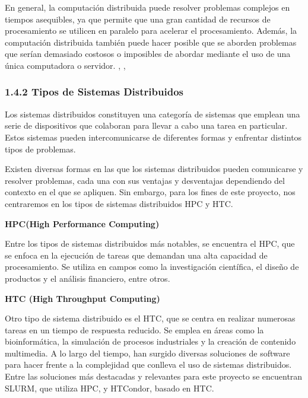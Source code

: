 \begin{spacing}{1.5}
  En general, la computación distribuida puede resolver problemas complejos en
  tiempos asequibles, ya que permite que una gran cantidad de recursos de
  procesamiento se utilicen en paralelo para acelerar el procesamiento. Además,
  la computación distribuida también puede hacer posible que se aborden problemas
  que serían demasiado costosos o imposibles de abordar mediante el uso de una
  única computadora o servidor. \cite{distributed-1}, \cite{distributed-4},
  \cite{distributed-3}

  \subsubsection{1.4.2 Tipos de Sistemas Distribuidos}

  Los sistemas distribuidos constituyen una categoría de sistemas que emplean
  una serie de dispositivos que colaboran para llevar a cabo una tarea en
  particular. Estos sistemas pueden intercomunicarse de diferentes formas y
  enfrentar distintos tipos de problemas.

  Existen diversas formas en las que los sistemas distribuidos pueden
  comunicarse y resolver problemas, cada una con sus ventajas y desventajas
  dependiendo del contexto en el que se apliquen. Sin embargo, para los fines de
  este proyecto, nos centraremos en los tipos de sistemas distribuidos HPC y HTC.
  \vspace{3mm}

  \textbf{HPC(High Performance Computing)}

  Entre los tipos de sistemas distribuidos más notables, se encuentra el HPC,
  que se enfoca en la ejecución de tareas que demandan una alta capacidad de
  procesamiento. Se utiliza en campos como la investigación científica, el diseño
  de productos y el análisis financiero, entre otros.

  \textbf{HTC (High Throughput Computing)}

  Otro tipo de sistema distribuido es el HTC, que se centra en realizar
  numerosas tareas en un tiempo de respuesta reducido. Se emplea en áreas como la
  bioinformática, la simulación de procesos industriales y la creación de
  contenido multimedia.
  A lo largo del tiempo, han surgido diversas soluciones de software para hacer
  frente a la complejidad que conlleva el uso de sistemas distribuidos. Entre las
  soluciones más destacadas y relevantes para este proyecto se encuentran SLURM,
  que utiliza HPC, y HTCondor, basado en HTC.  \vspace{3mm}


\end{spacing}
